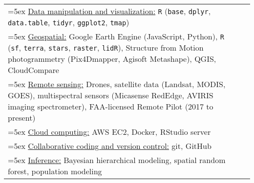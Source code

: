 \begin{longtable}{@{}>{\raggedright}p{6.25in} >{\raggedleft}X@{}}

\hangindent=5ex \underline{Data manipulation and visualization:} \texttt{R} (\texttt{base}, \texttt{dplyr}, \texttt{data.table}, \texttt{tidyr}, \texttt{ggplot2}, \texttt{tmap}) & \tabularnewline
\hangindent=5ex \underline{Geospatial:} Google Earth Engine (JavaScript, Python), \texttt{R} (\texttt{sf}, \texttt{terra}, \texttt{stars}, \texttt{raster},  \texttt{lidR}), Structure from Motion photogrammetry (Pix4Dmapper, Agisoft Metashape), QGIS, CloudCompare & \tabularnewline
\hangindent=5ex \underline{Remote sensing:} Drones, satellite data (Landsat, MODIS, GOES), multispectral sensors (Micasense RedEdge, AVIRIS imaging spectrometer), FAA-licensed Remote Pilot (2017 to present) & \tabularnewline
\hangindent=5ex \underline{Cloud computing:} AWS EC2, Docker, RStudio server & \tabularnewline
\hangindent=5ex \underline{Collaborative coding and version control:} git, GitHub & \tabularnewline
\hangindent=5ex \underline{Inference:} Bayesian hierarchical modeling, spatial random forest, population modeling & \tabularnewline

\end{longtable}